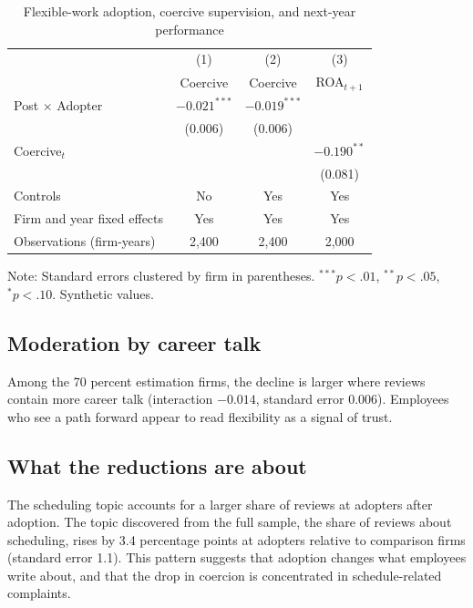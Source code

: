 \documentclass[12pt]{article}
\begin{document}
\begin{table}[t]
\centering
\begin{threeparttable}
\caption{Flexible-work adoption, coercive supervision, and next-year performance}\label{tab:main}
\begin{tabular}{lccc}
\toprule
 & (1) & (2) & (3)\\
 & Coercive & Coercive & ROA$_{t+1}$\\
\midrule
Post $\times$ Adopter & $-0.021^{***}$ & $-0.019^{***}$ & \\
 & (0.006) & (0.006) & \\
Coercive$_t$ & & & $-0.190^{**}$\\
 & & & (0.081)\\
Controls & No & Yes & Yes\\
Firm and year fixed effects & Yes & Yes & Yes\\
Observations (firm-years) & 2,400 & 2,400 & 2,000\\
\bottomrule
\end{tabular}
\begin{tablenotes}\footnotesize
\item Note: Standard errors clustered by firm in parentheses. $^{***}p<.01$, $^{**}p<.05$, $^{*}p<.10$. Synthetic values.
\end{tablenotes}
\end{threeparttable}
\end{table}

\subsection{Moderation by career talk}
Among the 70 percent estimation firms, the decline is larger where reviews contain more career talk (interaction $-0.014$, standard error $0.006$). Employees who see a path forward appear to read flexibility as a signal of trust.

\subsection{What the reductions are about}
The scheduling topic accounts for a larger share of reviews at adopters after adoption. The topic discovered from the full sample, the share of reviews about scheduling, rises by 3.4 percentage points at adopters relative to comparison firms (standard error 1.1). This pattern suggests that adoption changes what employees write about, and that the drop in coercion is concentrated in schedule-related complaints.
\end{document}
